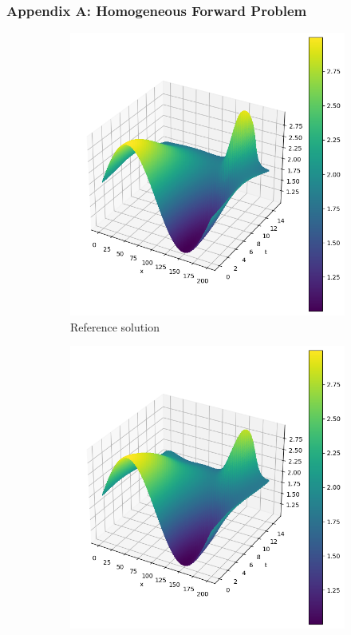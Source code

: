 \begin{frame}
    \frametitle{Appendix A: Homogeneous Forward Problem}

    \begin{figure}
        \centering
        \begin{subfigure}[b]{0.45\textwidth}
            \centering
            \includegraphics[width=\textwidth]{images/homogeneous_swe_pseudospectral_height.png}
            \caption{Reference solution}
            \label{fig:10_homogeneous_pseudospectral_swe_height}
        \end{subfigure}
        \hfill
        \begin{subfigure}[b]{0.45\textwidth}
            \centering
            \includegraphics[width=\textwidth]{images/homogeneous_swe_pinn_height.png}

\end{subfigure}
\end{figure}
\end{frame}
